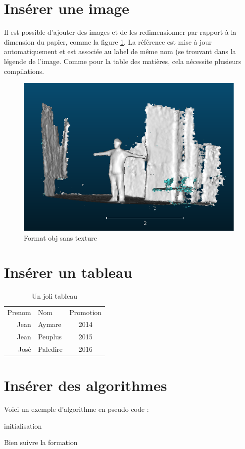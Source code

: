 \section{Insérer une image}
Il est possible d'ajouter des images et de les redimensionner par rapport à la dimension du papier, comme la figure \ref{format}.
La référence est mise à jour automatiquement et est associée au label de même nom (se trouvant dans la légende de l'image. Comme pour la table des matières, cela nécessite plusieurs compilations.
\begin{figure}[!ht]
	\begin{center}
		\includegraphics[width=0.50\linewidth, keepaspectratio]{../images/format.png}
		\caption{Format obj sans texture \label{format}}
	\end{center}
\end{figure}
  
\section{Insérer un tableau}
\begin{table}[!ht]
	\begin{center}
		\begin{tabular}{rl|c}
			Prenom & Nom      & Promotion \\
			Jean   & Aymare   & 2014      \\
			Jean   & Peuplus  & 2015      \\
			José  & Paledire & 2016      \\
		\end{tabular}
		\caption{Un joli tableau \label{tableau}}
	\end{center}
\end{table}
\section{Insérer des algorithmes}
Voici un exemple d'algorithme en pseudo code : 

\begin{algorithm}[H]
	\SetAlgoLined
	initialisation\;
	\caption{Bien suivre la formation}
\end{algorithm}
